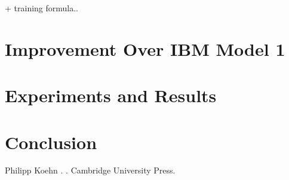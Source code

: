 \documentclass[11pt]{article}
\begin{document}
+ training formula..

\section{Improvement Over IBM Model 1}
\label{Improvment}

\section{Experiments and Results}
\label{Eval}

\section{Conclusion}
\label{Concl}

\begin{thebibliography}{}
\bibitem[1]{}
Philipp Koehn
.
.
\newblock Cambridge University Press.

\end{thebibliography}
\end{document}
